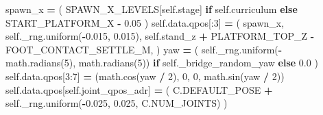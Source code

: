 \documentclass[
  chinese,
  11pt,
  letterpaper,
]{article}
\newenvironment{Shaded}{\begin{snugshade}}{\end{snugshade}}
\newcommand{\ControlFlowTok}[1]{\textcolor[rgb]{0.13,0.29,0.53}{\textbf{#1}}}
\newcommand{\DecValTok}[1]{\textcolor[rgb]{0.00,0.00,0.81}{#1}}
\newcommand{\FloatTok}[1]{\textcolor[rgb]{0.00,0.00,0.81}{#1}}
\newcommand{\NormalTok}[1]{#1}
\newcommand{\OperatorTok}[1]{\textcolor[rgb]{0.81,0.36,0.00}{\textbf{#1}}}
\newcommand{\VariableTok}[1]{\textcolor[rgb]{0.00,0.00,0.00}{#1}}
\renewenvironment{Shaded}{\par\smallskip}{\par\smallskip}
\begin{document}
\begin{Shaded}
\begin{Highlighting}[]
\NormalTok{        spawn\_x }\OperatorTok{=}\NormalTok{ (}
\NormalTok{            SPAWN\_X\_LEVELS[}\VariableTok{self}\NormalTok{.stage]}
            \ControlFlowTok{if} \VariableTok{self}\NormalTok{.curriculum}
            \ControlFlowTok{else}\NormalTok{ START\_PLATFORM\_X }\OperatorTok{{-}} \FloatTok{0.05}
\NormalTok{        )}
        \VariableTok{self}\NormalTok{.data.qpos[:}\DecValTok{3}\NormalTok{] }\OperatorTok{=}\NormalTok{ (}
\NormalTok{            spawn\_x,}
            \VariableTok{self}\NormalTok{.\_rng.uniform(}\OperatorTok{{-}}\FloatTok{0.015}\NormalTok{, }\FloatTok{0.015}\NormalTok{),}
            \VariableTok{self}\NormalTok{.stand\_z }\OperatorTok{+}\NormalTok{ PLATFORM\_TOP\_Z }\OperatorTok{{-}}\NormalTok{ FOOT\_CONTACT\_SETTLE\_M,}
\NormalTok{        )}
\NormalTok{        yaw }\OperatorTok{=}\NormalTok{ (}
            \VariableTok{self}\NormalTok{.\_rng.uniform(}\OperatorTok{{-}}\NormalTok{math.radians(}\DecValTok{5}\NormalTok{), math.radians(}\DecValTok{5}\NormalTok{))}
            \ControlFlowTok{if} \VariableTok{self}\NormalTok{.\_bridge\_random\_yaw}
            \ControlFlowTok{else} \FloatTok{0.0}
\NormalTok{        )}
        \VariableTok{self}\NormalTok{.data.qpos[}\DecValTok{3}\NormalTok{:}\DecValTok{7}\NormalTok{] }\OperatorTok{=}\NormalTok{ (math.cos(yaw }\OperatorTok{/} \DecValTok{2}\NormalTok{), }\DecValTok{0}\NormalTok{, }\DecValTok{0}\NormalTok{, math.sin(yaw }\OperatorTok{/} \DecValTok{2}\NormalTok{))}
        \VariableTok{self}\NormalTok{.data.qpos[}\VariableTok{self}\NormalTok{.joint\_qpos\_adr] }\OperatorTok{=}\NormalTok{ (}
\NormalTok{            C.DEFAULT\_POSE }\OperatorTok{+} \VariableTok{self}\NormalTok{.\_rng.uniform(}\OperatorTok{{-}}\FloatTok{0.025}\NormalTok{, }\FloatTok{0.025}\NormalTok{, C.NUM\_JOINTS)}
\NormalTok{        )}


\end{Highlighting}
\end{Shaded}
\end{document}
